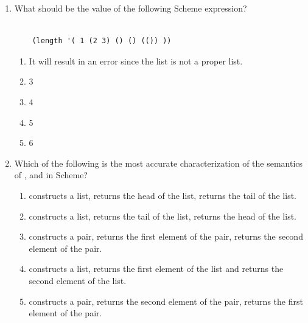 \documentclass[12pt]{article}
\begin{document}
\begin{enumerate}
\item What should be the value of the following Scheme expression?

\begin{verbatim}

    (length '( 1 (2 3) () () (()) ))

 \end{verbatim}


\begin{enumerate}

\item It will result in an error since the list is not a proper list.
  
\item 3

\item 4 
  
\item 5
  
\item 6
    
\end{enumerate}

\newpage




\item Which of the following is the most accurate characterization of
 the semantics of \verb@cons@, \verb@car@ and \verb@cdr@ in
 Scheme?

\begin{enumerate}

\item \verb@cons@ constructs a list, \verb@car@ returns the head
of the list, \verb@cdr@ returns the tail of the list.

\item \verb@cons@ constructs a list, \verb@car@ returns the tail
of the list, \verb@cdr@ returns the head of the list.

\item \verb@cons@ constructs a pair, \verb@car@ returns the first
element of the pair, \verb@cdr@ returns the second element of the pair.

\item \verb@cons@ constructs a list, \verb@car@ returns the first
 element of the list and \verb@cdr@ returns the second element of the
 list.

\item \verb@cons@ constructs a pair, \verb@car@ returns the second
element of the pair, \verb@cdr@ returns the first element of the pair.



\end{enumerate}
\end{enumerate}
\end{document}
